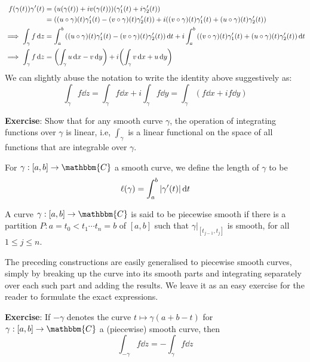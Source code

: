 \documentclass[../ComplexAnalysis_Notes.tex]{subfiles}
\begin{document}
\begin{align*}
   f(\gamma(t)) \gamma'(t) 
   &= \qty(u(\gamma(t))+i v(\gamma(t)))\qty(\gamma_1'(t)+i\gamma_2'(t)) \\
   &= \qty((u \circ \gamma)(t) \gamma_1'(t) - (v \circ \gamma)(t)\gamma_2'(t)) + i \qty((v \circ \gamma)(t) \gamma_1'(t) + (u \circ \gamma)(t)\gamma_2'(t)) \\
   \implies \int_\gamma f \dd{z}
   &= \int_a^b\qty((u \circ \gamma)(t) \gamma_1'(t) - (v \circ \gamma)(t)\gamma_2'(t)) \dd{t} + i \int_a^b \qty((v \circ \gamma)(t) \gamma_1'(t) + (u \circ \gamma)(t)\gamma_2'(t)) \dd{t} \\
   \implies \int_\gamma f \dd{z}
   &= \qty(\int_\gamma u \dd{x} - v \dd{y}) + i \qty(\int_\gamma v \dd{x} + u \dd{y})
\end{align*}
We can slightly abuse the notation to write the identity above suggestively as:
\[ 
 \int_\gamma f \dd{z} = \int_\gamma f \dd{x} + i \int_\gamma f \dd{y} = \int_\gamma (f \dd{x} + if \dd{y})
 \]

\textbf{Exercise}: Show that for any smooth curve \( \gamma \), the operation of integrating functions over \( \gamma \) is linear, i.e, \( \int_\gamma \) is a linear functional on the space of all functions that are integrable over \( \gamma \).

\begin{Def}{}{}
 For \( \gamma:[a,b] \to \mathbbm{C} \) a smooth curve, we define the length of \( \gamma \) to be
 \[ 
  \ell(\gamma) = \int_a^b \abs{\gamma'(t)} \dd{t}
  \]
\end{Def}

\begin{Def}{}{}
 A curve \( \gamma: [a,b] \to \mathbbm{C} \) is said to be piecewise smooth if there is a partition \( P: a = t_0 < t_1 \cdots t_n = b \) of \( [a,b] \) such that \(  \gamma \big\vert_{[t_{j-1}, t_{j}]} \) is smooth, for all \( 1 \leq j \leq n \).
\end{Def}

The preceding constructions are easily generalised to piecewise smooth curves, simply by breaking up the curve into its smooth parts and integrating separately over each such part and adding the results. We leave it as an easy exercise for the reader to formulate the exact expressions.
\smallskip

\textbf{Exercise}: If \( -\gamma \) denotes the curve \( t \mapsto \gamma(a+b-t) \) for \( \gamma: [a,b] \to \mathbbm{C} \) a (piecewise) smooth curve, then
\[ 
 \int_{-\gamma}f \dd{z} = - \int_\gamma f \dd{z}
 \]
\end{document}
